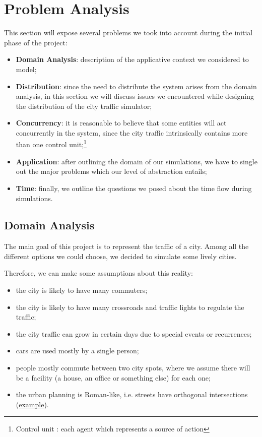 \section{Problem Analysis}

This section will expose several problems we took into account during the
initial phase of the project:

\begin{itemize}
\item \textbf{Domain Analysis}: description of the applicative context we
  considered to model;
\item \textbf{Distribution}: since the need to distribute the system arises from
  the domain analysis, in this section we will discuss issues we encountered
  while designing the distribution of the city traffic simulator;
\item \textbf{Concurrency}: it is reasonable to believe that some entities
  will act concurrently in the system, since the city traffic intrinsically
  contains more than one control unit;\footnote{Control unit : each
  agent which represents a source of action}
\item \textbf{Application}: after outlining the domain of our simulations, we
  have to single out the major problems which our level of abstraction entails;
\item \textbf{Time}: finally, we outline the questions we posed
about the time flow during simulations.
\end{itemize}


\subsection{Domain Analysis}\label{sec:pa-domain}
The main goal of this project is to represent the traffic of a city. Among all the
different options we could choose, we decided to simulate some lively cities.

Therefore, we can make some assumptions about this reality:

\begin{itemize}
\item the city is likely to have many commuters;
\item the city is likely to have many crossroads and traffic lights to
  regulate the traffic;
\item the city traffic can grow in certain days due to special events or
  recurrences;
\item cars are used mostly by a single person;
\item people mostly commute between two city spots, where we assume there
  will be a facility (a house, an office or something else) for each one;
\item the urban planning is Roman-like, i.e. streets have orthogonal
  intersections (\href{https://www.google.it/maps/place/San+Francisco,+California,+Stati+Uniti/@37.7766566,-122.4330836,16z/data=!4m2!3m1!1s0x80859a6d00690021:0x4a501367f076adff}{example}).
\end{itemize}

